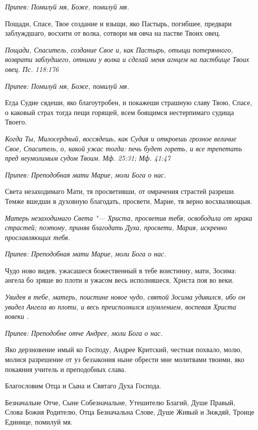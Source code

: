 \itshape Припев:\normalfont{} Помилуй мя, Боже, помилуй мя.


Пощади, Спасе, Твое создание и взыщи, яко Пастырь, погибшее, предвари заблуждшаго, восхити от волка, сотвори мя овча на пастве Твоих овец.


\itshape Пощади, Спаситель, создание Свое и, как Пастырь, отыщи потерянного, возврати заблудшего, отними у волка и сделай меня агнцем на пастбище Твоих овец. Пс. 118:176\normalfont{}


\itshape Припев:\normalfont{} Помилуй мя, Боже, помилуй мя.


Егда Судие сядеши, яко благоутробен, и покажеши страшную славу Твою, Спасе, о каковый страх тогда пещи горящей, всем боящимся нестерпимаго судища Твоего.


\itshape Когда Ты, Милосердный, воссядешь, как Судия и откроешь грозное величие Свое, Спаситель, о, какой ужас тогда: печь будет гореть, и все трепетать пред неумолимым судом Твоим. Мф. 25:31; Мф. 41:47\normalfont{}


\itshape Припев:\normalfont{} Преподобная мати Марие, моли Бога о нас.


Света незаходимаго Мати, тя просветивши, от омрачения страстей разреши. Темже вшедши в духовную благодать, просвети, Марие, тя верно восхваляющыя.


\itshape Матерь незаходимаго Света "--- Христа, просветив тебя, освободила от мрака страстей; поэтому, приняв благодать Духа, просвети, Мария, искренно прославляющих тебя.\normalfont{}


\itshape Припев:\normalfont{} Преподобная мати Марие, моли Бога о нас.


Чудо ново видев, ужасашеся божественный в тебе воистинну, мати, Зосима: ангела бо зряше во плоти и ужасом весь исполняшеся, Христа поя во веки.


\itshape Увидев в тебе, матерь, поистине новое чудо, святой Зосима удивился, ибо он увидел Ангела во плоти, и весь преисполнился изумлением, воспевая Христа вовеки .\normalfont{}


\itshape Припев:\normalfont{} Преподобне отче Андрее, моли Бога о нас.


Яко дерзновение имый ко Господу, Андрее Критский, честная похвало, молю, молися разрешение от уз беззакония ныне обрести мне молитвами твоими, яко покаяния учитель и преподобных слава.


Благословим Отца и Сына и Святаго Духа Господа.


Безначальне Отче, Сыне Собезначальне, Утешителю Благий, Душе Правый, Слова Божия Родителю, Отца Безначальна Слове, Душе Живый и Зиждяй, Троице Единице, помилуй мя.


